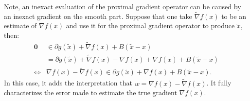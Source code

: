 \documentclass[12pt]{article}
\begin{document}
        Note, an inexact evaluation of the proximal gradient operator can be caused by an inexact gradient on the smooth part. 
        Suppose that one take $\tilde \nabla f(x)$ to be an estimate of $\nabla f(x)$ and use it for the proximal gradient operator to produce $\tilde x$, then: 
        \begin{align*}
            \mathbf 0 
            &\in \partial g(\tilde x) + \tilde \nabla f(x) + B(\tilde x - x)
            \\
            &= 
            \partial g(\tilde x) + \tilde\nabla f(x) - \nabla f(x) 
            + \nabla f(x) + B(\tilde x - x)
            \\
            \iff &
            \nabla f(x) - \tilde \nabla f(x) \in 
            \partial g(\tilde x) 
            + \nabla f(x) + B(\tilde x - x).
        \end{align*}
        In this case, it adds the interpretation that $w = \nabla f(x) - \tilde \nabla f(x)$. 
        It fully characterizes the error made to estimate the true gradient $\nabla f(x)$. 
\end{document}
